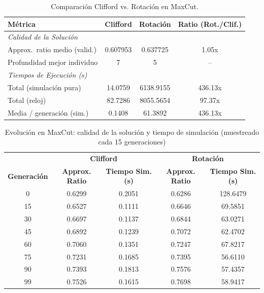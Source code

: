 \begin{table}[htbp]
\centering
\begin{tabular}{lccc}
\toprule
\textbf{Métrica} & \textbf{Clifford} & \textbf{Rotación} & \textbf{Ratio (Rot./Clif.)} \\
\midrule
\multicolumn{4}{l}{\textit{Calidad de la Solución}} \\
\midrule
Approx.\ ratio medio (valid.) & 0.607953 & 0.637725 & 1.05x \\
Profundidad mejor individuo & 7 & 5 & -- \\
\midrule
\multicolumn{4}{l}{\textit{Tiempos de Ejecución (s)}} \\
\midrule
Total (simulación pura) & 14.0759 & 6138.9155 & 436.13x \\
Total (reloj) & 82.7286 & 8055.5654 & 97.37x \\
Media / generación (sim.) & 0.1408 & 61.3892 & 436.13x \\
\bottomrule
\end{tabular}
\caption{Comparación Clifford vs. Rotación en MaxCut.}
\label{tab:comparison-maxcut}
\end{table}

\begin{table}[htbp]
\centering
\begin{tabular}{c | cc | cc}
\toprule
& \multicolumn{2}{c|}{\textbf{Clifford}} & \multicolumn{2}{c}{\textbf{Rotación}} \\
\textbf{Generación} & \textbf{Approx. Ratio} & \textbf{Tiempo Sim. (s)} & \textbf{Approx. Ratio} & \textbf{Tiempo Sim. (s)} \\
\midrule
0 & 0.6299 & 0.2051 & 0.6286 & 128.6479 \\
15 & 0.6527 & 0.1111 & 0.6646 & 69.5851 \\
30 & 0.6697 & 0.1137 & 0.6844 & 63.0271 \\
45 & 0.6892 & 0.1239 & 0.7072 & 62.4702 \\
60 & 0.7060 & 0.1351 & 0.7247 & 67.8217 \\
75 & 0.7231 & 0.1685 & 0.7395 & 56.6110 \\
90 & 0.7393 & 0.1813 & 0.7576 & 57.4357 \\
99 & 0.7526 & 0.1615 & 0.7698 & 58.9417 \\
\bottomrule
\end{tabular}
\caption{Evolución en MaxCut: calidad de la solución y tiempo de simulación (muestreado cada 15 generaciones)}
\label{tab:history-maxcut}
\end{table}
